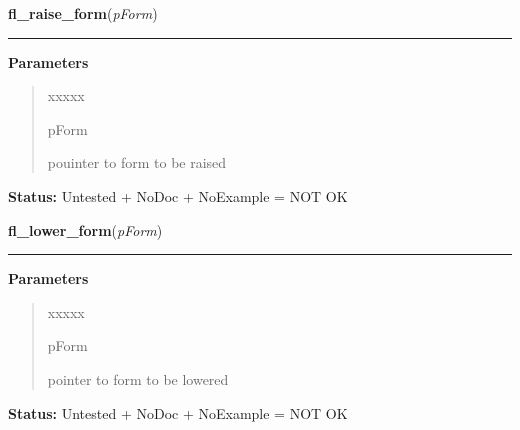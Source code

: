 \hspace{.8\funcindent}\begin{boxedminipage}{\funcwidth}

    \raggedright \textbf{fl\_raise\_form}(\textit{pForm})

    \vspace{-1.5ex}

    \rule{\textwidth}{0.5\fboxrule}
\setlength{\parskip}{2ex}
\setlength{\parskip}{1ex}
      \textbf{Parameters}
      \vspace{-1ex}

      \begin{quote}
        \begin{Ventry}{xxxxx}

          \item[pForm]

          pouinter to form to be raised

        \end{Ventry}

      \end{quote}

\textbf{Status:} Untested + NoDoc + NoExample = NOT OK



    \end{boxedminipage}

    \label{xformslib:library:fl_lower_form}

    \vspace{0.5ex}

\hspace{.8\funcindent}\begin{boxedminipage}{\funcwidth}

    \raggedright \textbf{fl\_lower\_form}(\textit{pForm})

    \vspace{-1.5ex}

    \rule{\textwidth}{0.5\fboxrule}
\setlength{\parskip}{2ex}
\setlength{\parskip}{1ex}
      \textbf{Parameters}
      \vspace{-1ex}

      \begin{quote}
        \begin{Ventry}{xxxxx}

          \item[pForm]

          pointer to form to be lowered

        \end{Ventry}

      \end{quote}

\textbf{Status:} Untested + NoDoc + NoExample = NOT OK



    \end{boxedminipage}

